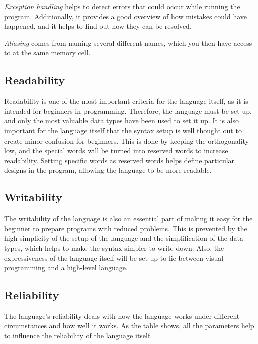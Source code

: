 \textit{Exception handling} helps to detect errors that could occur while running the program. Additionally, it provides a good overview of how mistakes could have happened, and it helps to find out how they can be resolved.

\textit{Aliasing} comes from naming several different names, which you then have access to at the same memory cell.




\subsection{Readability}
Readability is one of the most important criteria for the language itself, as it is intended for beginners in programming. 
Therefore, the language must be set up, and only the most valuable data types have been used to set it up. It is also important for the language itself that the syntax setup is well thought out to create minor confusion for beginners.
 This is done by keeping the orthogonality low, and the special words will be turned into reserved words to increase readability. 
Setting specific words as reserved words helps define particular designs in the program, allowing the language to be more readable.

\subsection{Writability}

The writability of the language is also an essential part of making it easy for the beginner to prepare programs with reduced problems. 
This is prevented by the high simplicity of the setup of the language and the simplification of the data types, which helps to make the syntax simpler to write down.
 Also, the expressiveness of the language itself will be set up to lie between visual programming and a high-level language.

 \subsection{Reliability}
 The language's reliability deals with how the language works under different circumstances and how well it works. 
 As the table shows, all the parameters help to influence the reliability of the language itself.
